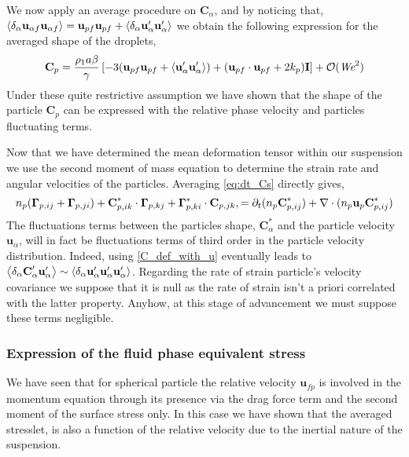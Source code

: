 We now apply an average procedure on $\textbf{C}_\alpha$, and by noticing that, $\left<\delta_\alpha \textbf{u}_{\alpha f}\textbf{u}_{\alpha f}\right> = \textbf{u}_{pf}\textbf{u}_{pf} + \left<\delta_\alpha \textbf{u}_\alpha'\textbf{u}_\alpha'\right>$ we obtain the following expression 
for the averaged shape of the droplets, 
\begin{equation*}
    \textbf{C}_p  =  \frac{ \rho_1 a \beta}{\gamma} \left[
        -  3
        (\textbf{u}_{p f}\textbf{u}_{p f} + \left<\textbf{u}_\alpha'\textbf{u}_\alpha'\right>)
        +   (\textbf{u}_{p f}\cdot\textbf{u}_{p f}+2k_p)\textbf{I}
    \right]
    + \mathcal{O}(\textit{We}^2)
\end{equation*}
Under these quite restrictive assumption we have shown that the shape of the particle $\textbf{C}_p$ can be expressed with the relative phase velocity and particles fluctuating terms. 

Now that we have determined the mean deformation tensor within our suspension we use the second moment of mass equation to determine the strain rate and angular velocities of the particles. 
Averaging \ref{eq:dt_Cs} directly gives, 
\begin{equation}
    n_p 
    (\bm\Gamma_{p,ij}
    +  \bm\Gamma_{p,ji})
    + \textbf{C}_{p,ik}^* \cdot \bm\Gamma_{p,kj}
    + \bm\Gamma_{p,ki}^* \cdot \textbf{C}_{p,jk},
    = 
    \partial_t (n_p \textbf{C}_{p,ij}^*)
    + \mathbf{\nabla}\cdot(n_p \textbf{u}_p \textbf{C}_{p,ij}^*)
\end{equation}
The fluctuations terms between the particles shape, $\textbf{C}_\alpha^*$ and the particle velocity $\textbf{u}_\alpha$, will in fact be fluctuations terms of third order in the particle velocity distribution.
Indeed, using \ref{C_def_with_u} eventually leads to $\left<\delta_\alpha \textbf{C}'_\alpha \textbf{u}_\alpha'\right> \sim \left<\delta_\alpha \textbf{u}_\alpha'\textbf{u}_\alpha' \textbf{u}_\alpha'\right>$. 
Regarding the rate of strain particle's velocity covariance we suppose that it is null as the rate of strain isn't a priori correlated with the latter property. 
Anyhow, at this stage of advancement we must suppose these terms negligible. 

\subsubsection*{Expression of the fluid phase equivalent stress}

We have seen that for spherical particle the relative velocity $\textbf{u}_{fp}$ is involved in the momentum equation through its presence via the drag force term and the second moment of the surface stress only.  
In this case we have shown that the averaged stresslet, is also a function of the relative velocity due to the inertial nature of the suspension. 

